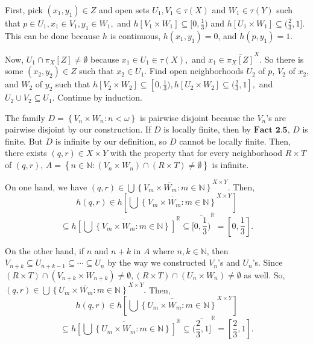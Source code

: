\documentclass{article}
\begin{document}
First, pick $(x_1,y_1)\in Z$ and open sets $U_1,V_1\in \tau(X)$ and $W_1\in \tau(Y)$ such that $p\in U_1, x_1\in V_1, y_1\in W_1,$ and $h\left[V_1\times W_1\right] \subseteq [0,\frac{1}{3})$ and $h\left[U_1\times W_1\right] \subseteq (\frac{2}{3}, 1]$. This can be done because $h$ is continuous, $h(x_1,y_1)=0$, and $h(p,y_1)=1$.

\vskip 10pt

Now, $U_1\cap \pi_X[Z]\neq \emptyset$ because $x_1\in U_1\in \tau(X), $ and $x_1\in \overline{\pi_X[Z]}^X.$ So there is some $(x_2,y_2)\in Z$ such that $x_2\in U_1$. Find open neighborhoods $U_2$ of $p$, $V_2$ of $x_2$, and $W_2$ of $y_2$ such that $h\left[V_2\times W_2\right] \subseteq [0,\frac{1}{3}), h\left[U_2\times W_2\right]\subseteq (\frac{2}{3},1],$ and $U_2\cup V_2\subseteq U_1$. Continue by induction. 


\vskip 20pt
The family $D=\left\{V_n\times W_n: n<\omega\right\}$ is pairwise disjoint because the $V_n$'s are pairwise disjoint by our construction. If $D$ is locally finite, then by $\textbf{Fact 2.5}$, $D$ is finite. But $D$ is infinite by our definition, so $D$ cannot be locally finite. Then, there exists $(q,r)\in X\times Y$ with the property that for every neighborhood $R\times T$ of $(q,r)$, $A=\left\{n\in \mathbb{N}: (V_n\times W_n)\cap (R\times T) \neq \emptyset\right\}$ is infinite. 
\vskip 20pt

On one hand, we have $(q,r)\in \overline{\bigcup\left\{V_m\times W_m: m\in \mathbb{N}\right\}}^{X\times Y}.$ Then, 
$$h(q,r)\in h\left[\overline{\bigcup\left\{V_m\times W_m: m\in \mathbb{N}\right\}}^{X\times Y}\right] $$
$$\subseteq \overline{h\left[\bigcup\left\{V_m\times W_m: m\in \mathbb{N}\right\}\right]}^{\mathbb{R}}\subseteq \overline{[0,\frac{1}{3})}^\mathbb{R}=[0,\frac{1}{3}].$$

\vskip 20pt

On the other hand, if $n$ and $n+k$ in $A$ where $n,k\in \mathbb{N}$, then $V_{n+k}\subseteq U_{n+k-1}\subseteq \cdots \subseteq U_n$ by the way we constructed $V_n$'s and $U_n$'s. Since $(R\times T)\cap (V_{n+k}\times W_{n+k})\neq \emptyset, (R\times T)\cap (U_n\times W_n) \neq \emptyset$ as well. 
\vskip 10pt
So, $(q,r)\in \overline{\bigcup\left\{U_m\times W_m: m\in \mathbb{N}\right\}}^{X\times Y}.$ Then, 
$$h(q,r)\in h\left[\overline{\bigcup\left\{U_m\times W_m: m\in \mathbb{N}\right\}}^{X\times Y}\right] $$
$$\subseteq \overline{h\left[\bigcup\left\{U_m\times W_m: m\in \mathbb{N}\right\}\right]}^{\mathbb{R}}\subseteq \overline{(\frac{2}{3},1]}^\mathbb{R}=[\frac{2}{3}, 1].$$
\end{document}
